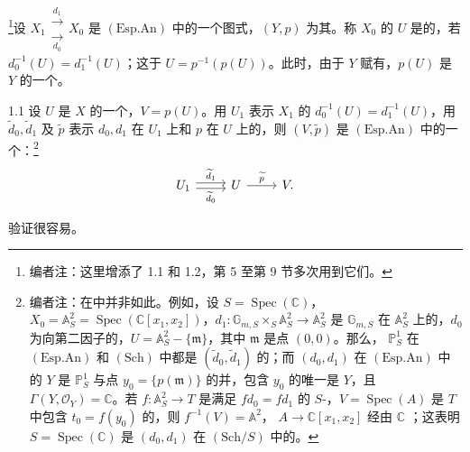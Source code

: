 \footnote{编者注：这里增添了 1.1 和 1.2，第 5 至第 9 节多次用到它们。}设 $X_1\mathrel{\substack{\xrightarrow{d_1}\\[-.6ex]\xrightarrow[d_0]{}}}X_0$ 是 $(\mathrm{Esp.An})$ 中的一个图式，$(Y,p)$ 为其。称 $X_0$ 的 $U$ 是的，若 $d_0^{-1}(U)=d_1^{-1}(U)$；这于 $U=p^{-1}(p(U))$。此时，由于 $Y$ 赋有，$p(U)$ 是 $Y$ 的一个。
\begin{SGAresult}{}{1.1}
设 $U$ 是 $X$ 的一个，$V=p(U)$。用 $U_1$ 表示 $X_1$ 的 $d_0^{-1}(U)=d_1^{-1}(U)$，用 $\widetilde d_0,\widetilde d_1$ 及 $\widetilde p$ 表示 $d_0,d_1$ 在 $U_1$ 上和 $p$ 在 $U$ 上的，则 $(V,\widetilde p)$ 是 $(\mathrm{Esp.An})$ 中的一个：\footnote{编者注：在中并非如此。例如，设 $S=\operatorname{Spec}(\mathbb C)$，$X_0=\mathbb A^2_S=\operatorname{Spec}(\mathbb C[x_1,x_2])$，$d_1:\mathbb G_{m,S}\times_S\mathbb A^2_S\to\mathbb A^2_S$ 是 $\mathbb G_{m,S}$ 在 $\mathbb A^2_S$ 上的，$d_0$ 为向第二因子的，$U=\mathbb A^2_S-\{\mathfrak m\}$，其中 $\mathfrak m$ 是点 $(0,0)$。那么， $\mathbb P^1_S$ 在 $(\mathrm{Esp.An})$ 和 $(\mathrm{Sch})$ 中都是 $(\widetilde d_0,\widetilde d_1)$ 的；而 $(d_0,d_1)$ 在 $(\mathrm{Esp.An})$ 中的 $Y$ 是 $\mathbb P^1_S$ 与点 $y_0=\{p(\mathfrak m)\}$ 的并，包含 $y_0$ 的唯一是 $Y$，且 $\Gamma(Y,\mathcal O_Y)=\mathbb C$。若 $f:\mathbb A^2_S\to T$ 是满足 $fd_0=fd_1$ 的 $S$-，$V=\operatorname{Spec}(A)$ 是 $T$ 中包含 $t_0=f(y_0)$ 的，则 $f^{-1}(V)=\mathbb A^2$， $A\to\mathbb C[x_1,x_2]$ 经由 $\mathbb C$ ；这表明 $S=\operatorname{Spec}(\mathbb C)$ 是 $(d_0,d_1)$ 在 $(\mathrm{Sch}/S)$ 中的。}
\[
\begin{tikzcd}
U_1\arrow[r,shift left=.5ex,"\widetilde d_1"]\arrow[r,shift right=.5ex,"\widetilde d_0"']&U\arrow[r,"\widetilde p"]&V.
\end{tikzcd}
\]
\end{SGAresult}
验证很容易。
